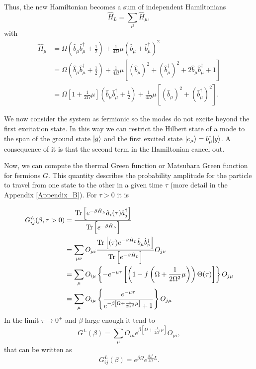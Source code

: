 Thus, the new Hamiltonian becomes a sum of independent Hamiltonians
\begin{equation}
    \hat H_L = \sum_\mu \hat H_\mu,
\end{equation}
with
\begin{equation}
    \begin{split}
        \hat H_\mu &= \Omega \left(\hat b_\mu\hat b^\dagger_\mu + \frac{1}{2}\right) + \frac{1}{4\Omega}\mu\left(\hat b_\mu +\hat b_\mu^\dagger\right)^2\\
        &= \Omega \left(\hat b_\mu\hat b^\dagger_\mu + \frac{1}{2}\right) + \frac{1}{4\Omega}\mu\left[\left(\hat b_\mu\right)^2 +\left(\hat b_\mu^\dagger\right)^2 + 2 \hat b_\mu \hat b_\mu^\dagger + 1 \right]\\
        &= \Omega \left[ 1 + \frac{1}{2\Omega}\mu\right] \left(\hat b_\mu\hat b^\dagger_\mu + \frac{1}{2}\right) + \frac{1}{4\Omega}\mu\left[\left(\hat b_\mu\right)^2 +\left(\hat b_\mu^\dagger\right)^2 \right].
    \end{split}
\end{equation}

We now consider the system as fermionic so the modes do not excite beyond the first excitation state. In this way we can restrict the Hilbert state of a mode to the span of the ground state $\lvert g\rangle$ and the first excited state $\lvert e_\mu\rangle=b_\mu^\dagger\lvert g\rangle$. A consequence of it is that the second term in the Hamiltonian cancel out. 


Now, we can compute the thermal Green function or Matsubara Green function for fermions $G$. This quantity describes the probability amplitude for the particle to travel from one state to the other in a given time $\tau$ (more detail in the Appendix \ref{Appendix_B}). For $\tau > 0$ it is

\begin{equation}
    \begin{split}
        G^L_{ij}(\beta, \tau > 0) &= \frac{\operatorname{Tr}\left[e^{-\beta \hat H_L}\hat a_i (\tau)  \hat a_j^\dagger\right]}{\operatorname{Tr}\left[e^{-\beta \hat H_L}\right]} \\
        &=\sum_{\mu\nu} O_{\mu i}\frac{\operatorname{Tr}\left[ (\tau) e^{-\beta \hat H_L} \hat b_\mu\hat b_\nu^\dagger\right]}{\operatorname{Tr}\left[e^{-\beta \hat H_L}\right]}O_{j\nu}\\
        &= \sum_{\mu} O_{i\mu}\left\{-e^{-\mu \tau}\left[\left(1-f\left( \Omega + \frac{1}{2\Omega^2}\mu\right)\right)\Theta(\tau)\right]\right\}O_{j\mu}\\
        &= \sum_{\mu} O_{i\mu}\left\{\frac{e^{-\mu \tau}}{e^{-\beta\left[ \Omega + \frac{1}{2\Omega^2}\mu\right]} + 1}\right\}O_{j\mu}\\
    \end{split}
\end{equation}
In the limit $\tau \rightarrow 0^+$ and $\beta$ large enough it tend to
\begin{equation}
    G^L(\beta) = \sum_{\mu} O_{i\mu}{e^{\beta\left[ \Omega + \frac{1}{2\Omega^2}\mu\right]}} O_{\mu i},
\end{equation}
that can be written as
\begin{equation}
    G^L_{ij}(\beta)= e^{\beta \Omega}e^{\frac{\beta \omega^2}{2\Omega}L}.
\end{equation}

